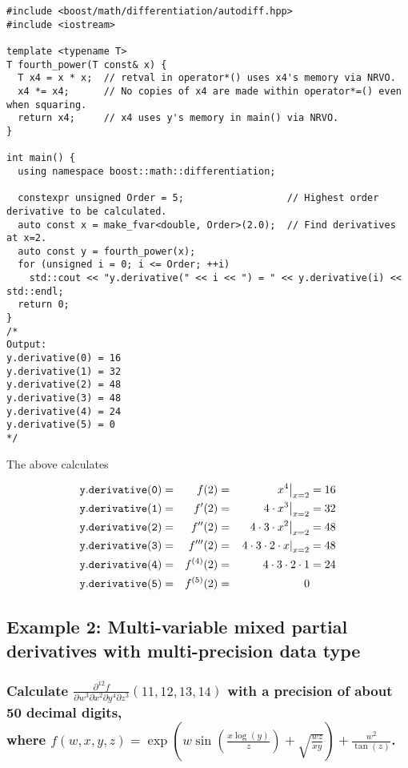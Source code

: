 \documentclass{article}
\begin{document}
\begin{verbatim}
#include <boost/math/differentiation/autodiff.hpp>
#include <iostream>

template <typename T>
T fourth_power(T const& x) {
  T x4 = x * x;  // retval in operator*() uses x4's memory via NRVO.
  x4 *= x4;      // No copies of x4 are made within operator*=() even when squaring.
  return x4;     // x4 uses y's memory in main() via NRVO.
}

int main() {
  using namespace boost::math::differentiation;

  constexpr unsigned Order = 5;                  // Highest order derivative to be calculated.
  auto const x = make_fvar<double, Order>(2.0);  // Find derivatives at x=2.
  auto const y = fourth_power(x);
  for (unsigned i = 0; i <= Order; ++i)
    std::cout << "y.derivative(" << i << ") = " << y.derivative(i) << std::endl;
  return 0;
}
/*
Output:
y.derivative(0) = 16
y.derivative(1) = 32
y.derivative(2) = 48
y.derivative(3) = 48
y.derivative(4) = 24
y.derivative(5) = 0
*/
\end{verbatim}
The above calculates

\begin{alignat*}{3}
{\tt y.derivative(0)} &=& f(2) =&& \left.x^4\right|_{x=2} &= 16\\
{\tt y.derivative(1)} &=& f'(2) =&& \left.4\cdot x^3\right|_{x=2} &= 32\\
{\tt y.derivative(2)} &=& f''(2) =&& \left.4\cdot 3\cdot x^2\right|_{x=2} &= 48\\
{\tt y.derivative(3)} &=& f'''(2) =&& \left.4\cdot 3\cdot2\cdot x\right|_{x=2} &= 48\\
{\tt y.derivative(4)} &=& f^{(4)}(2) =&& 4\cdot 3\cdot2\cdot1 &= 24\\
{\tt y.derivative(5)} &=& f^{(5)}(2) =&& 0 &
\end{alignat*}

\subsection{Example 2: Multi-variable mixed partial derivatives with multi-precision data type}\label{multivar}
\subsubsection{Calculate $\frac{\partial^{12}f}{\partial w^{3}\partial x^{2}\partial y^{4}\partial z^{3}}(11,12,13,14)$
with a precision of about 50 decimal digits,\\
where $f(w,x,y,z)=\exp\left(w\sin\left(\frac{x\log(y)}{z}\right)+\sqrt{\frac{wz}{xy}}\right)+\frac{w^2}{\tan(z)}$.}
\end{document}
